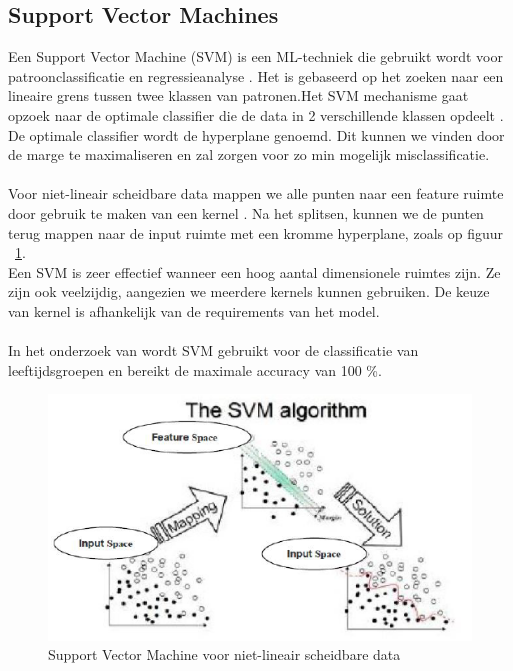 \subsection{Support Vector Machines} \label{sub:svm}
Een Support Vector Machine (SVM) is een ML-techniek die gebruikt wordt voor patroonclassificatie en regressieanalyse \autocite{Chen2011}. Het is gebaseerd op het zoeken naar een lineaire grens tussen twee klassen van patronen.Het SVM mechanisme gaat opzoek naar de optimale classifier die de data in 2 verschillende klassen opdeelt \autocite{Rustam2018}. De optimale classifier wordt de hyperplane genoemd. Dit kunnen we vinden door de marge te maximaliseren en zal zorgen voor zo min mogelijk misclassificatie. \\
\\
Voor niet-lineair scheidbare data mappen we alle punten naar een feature ruimte door gebruik te maken van een kernel \autocite{Shah2012}. Na het splitsen, kunnen we de punten terug mappen naar de input ruimte met een kromme hyperplane, zoals op figuur {~\ref{fig:svm}}. \\
Een SVM is zeer effectief wanneer een hoog aantal dimensionele ruimtes zijn. Ze zijn ook veelzijdig, aangezien we meerdere kernels kunnen gebruiken. De keuze van kernel is afhankelijk van de requirements van het model. \\
\\
In het onderzoek van \textcite{Rustam2018} wordt SVM gebruikt voor de classificatie van leeftijdsgroepen en bereikt de maximale accuracy van 100 \%.
\begin{figure}
    \centering
    \includegraphics{graphics/svm-non-lineair.PNG}
    \caption[SVM]{\label{fig:svm}Support Vector Machine voor niet-lineair scheidbare data}
\end{figure}

